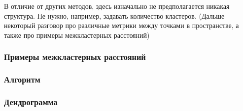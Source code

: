 \documentclass[12pt,a4paper,final]{article}
\newcommand{\1}{\mathds{1}}
\begin{document}
В отличие от других методов, здесь изначально не предполагается никакая структура. Не нужно, например, задавать количество кластеров. (Дальше некоторый разговор про различные метрики между точками в пространстве, а также про примеры межкластерных расстояний)

\subsubsection*{Примеры межкластерных расстояний}

\subsubsection*{Алгоритм}

\subsubsection*{Дендрограмма}
\end{document}
